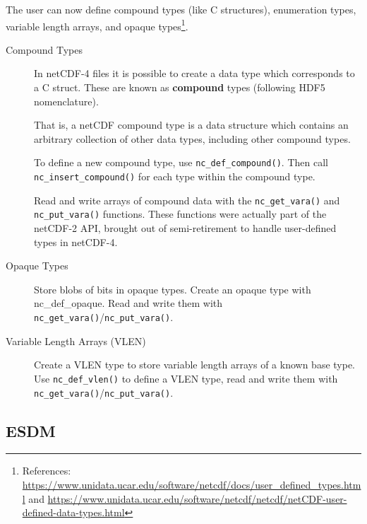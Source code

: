 \tab
The user can now define compound types (like C structures), enumeration types, variable length arrays, and opaque types\footnote{References: \url{https://www.unidata.ucar.edu/software/netcdf/docs/user\_defined\_types.html} and \url{https://www.unidata.ucar.edu/software/netcdf/netcdf/netCDF-user-defined-data-types.html}}.

\begin{description}

\item[Compound Types]

In netCDF-4 files it is possible to create a data type which corresponds to a C struct. These are known as \textbf{compound} types (following HDF5 nomenclature).

That is, a netCDF compound type is a data structure which contains an arbitrary collection of other data types, including other compound types.

To define a new compound type, use \texttt{nc\_def\_compound()}. Then call \texttt{nc\_insert\_compound()} for each type within the compound type.

Read and write arrays of compound data with the \texttt{nc\_get\_vara()} and \texttt{nc\_put\_vara()} functions. These functions were actually part of the netCDF-2 API, brought out of semi-retirement to handle user-defined types in netCDF-4.

\item[Opaque Types]

Store blobs of bits in opaque types. Create an opaque type with nc\_def\_opaque. Read and write them with \texttt{nc\_get\_vara()}/\texttt{nc\_put\_vara()}.

\item[Variable Length Arrays (VLEN)]

Create a VLEN type to store variable length arrays of a known base type. Use \texttt{nc\_def\_vlen()} to define a VLEN type, read and write them with \texttt{nc\_get\_vara()}/\texttt{nc\_put\_vara()}.

\end{description}

\subsection{ESDM}


